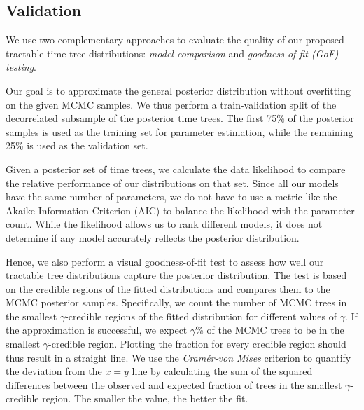 \documentclass[10pt,letterpaper]{article}
\begin{document}
\subsection*{Validation}

We use two complementary approaches to evaluate the quality of our proposed tractable time tree distributions: \emph{model comparison} and \emph{goodness-of-fit (GoF) testing}.

Our goal is to approximate the general posterior distribution without overfitting on the given MCMC samples. We thus perform a train-validation split of the decorrelated subsample of the posterior time trees. The first 75\% of the posterior samples is used as the training set for parameter estimation, while the remaining 25\% is used as the validation set.

Given a posterior set of time trees, we calculate the data likelihood to compare the relative performance of our distributions on that set. Since all our models have the same number of parameters, we do not have to use a metric like the Akaike Information Criterion (AIC) to balance the likelihood with the parameter count. While the likelihood allows us to rank different models, it does not determine if any model accurately reflects the posterior distribution.

Hence, we also perform a visual goodness-of-fit test to assess how well our tractable tree distributions capture the posterior distribution. The test is based on the credible regions of the fitted distributions and compares them to the MCMC posterior samples. Specifically, we count the number of MCMC trees in the smallest $\gamma$-credible regions of the fitted distribution for different values of $\gamma$. If the approximation is successful, we expect $\gamma$\% of the MCMC trees to be in the smallest $\gamma$-credible region. Plotting the fraction for every credible region should thus result in a straight line. We use the \emph{Cramér-von Mises} criterion \cite{cramervonmises} to quantify the deviation from the $x=y$ line by calculating the sum of the squared differences between the observed and expected fraction of trees in the smallest $\gamma$-credible region. The smaller the value, the better the fit.
\end{document}
